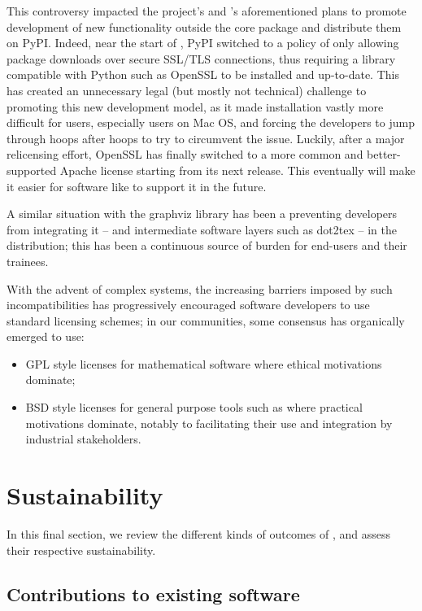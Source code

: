 \documentclass{deliverablereport}
\begin{document}
This controversy impacted the \Sage project's and \ODK's aforementioned plans
to promote development of new functionality outside the core package and
distribute them on PyPI.  Indeed, near the start of \ODK, PyPI
switched to a policy of only allowing package downloads over secure SSL/TLS
connections, thus requiring a library compatible with Python such as OpenSSL to
be installed and up-to-date.  This has created an unnecessary legal (but
mostly not technical) challenge to promoting this new development model,
as it made installation vastly more difficult for users, especially users on
Mac OS, and forcing the developers to jump through hoops after hoops to
try to circumvent the issue.
Luckily, after a major relicensing effort, OpenSSL has finally switched
to a more common and better-supported Apache license starting from its
next release. This eventually will make it easier for software like
\Sage to support it in the future.

A similar situation with the graphviz library has been a preventing
developers from integrating it -- and intermediate software layers
such as dot2tex -- in the \SageMath distribution; this has been a
continuous source of burden for end-users and their trainees.

With the advent of complex systems, the increasing barriers imposed by
such incompatibilities has progressively encouraged software
developers to use standard licensing schemes; in our communities, some
consensus has organically emerged to use:
\begin{itemize}
\item GPL style licenses for mathematical software where ethical
  motivations dominate;
\item BSD style licenses for general purpose tools such as \Jupyter
  where practical motivations dominate, notably to facilitating their
  use and integration by industrial stakeholders.
\end{itemize}


\section{Sustainability}

In this final section, we review the different kinds of outcomes of
\ODK, and assess their respective sustainability.

\subsection{Contributions to existing software}
\end{document}
